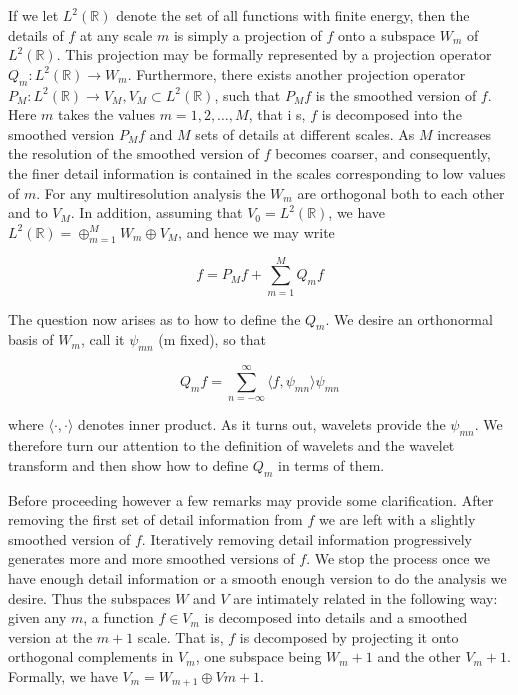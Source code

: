 \documentclass[a4paper,12pt]{article}
\begin{document}
 If we let \(L^2(\mathbb{R})\) denote the set of all functions with finite energy, then the details of \(f\) at 
 any scale \(m\) is simply a projection of \(f\) onto a subspace \(W_m\) of \(L^2(\mathbb{R})\). This projection 
 may be formally represented by a projection operator \(Q_m : L^2(\mathbb{R}) \rightarrow W_m\). Furthermore, 
 there exists another projection operator \(P_M : L^2(\mathbb{R}) \rightarrow V_M, V_M \subset L^2(\mathbb{R})\), 
 such that \(P_M f\) is the smoothed version of \(f\). Here \(m\) takes the values \(m = 1,2,\ldots ,M\), that i
 s, \(f\) is decomposed into the smoothed version \(P_M f\) and \(M\) sets of details at different scales. 
 As \(M\) increases the resolution of the smoothed version of \(f\) becomes coarser, and consequently, the finer 
 detail information is contained in the scales corresponding to low values of \(m\). For any multiresolution 
 analysis the \(W_m\) are orthogonal both to each other and to \(V_M\). In addition, assuming 
 that \(V_0 = L^2(\mathbb{R})\), we have \(L^2(\mathbb{R}) = \oplus_{m=1}^{M} W_m \oplus V_M\), and hence we may write

\[ f = P_M f + \sum_{m=1}^{M} Q_m f \]

The question now arises as to how to define the \(Q_m\).
We desire an orthonormal basis of \(W_m\), call it \(\psi_{mn}\) (m fixed), so that

\[
Q_m f = \sum_{n=-\infty}^{\infty} \langle f, \psi_{mn} \rangle \psi_{mn}
\]

where \(\langle \cdotp,\cdotp \rangle\) denotes inner product. As it turns out, wavelets provide 
the \(\psi_{mn}\)\(\). We therefore turn our attention to the definition of wavelets and the wavelet transform and 
then show how to define \(Q_m\) in terms of them.

Before proceeding however a few remarks may provide some clarification. After removing the first set of detail 
information from \(f\) we are left with a slightly smoothed version of \(f\). Iteratively removing detail information 
progressively generates more and more smoothed versions of \(f\). We stop the process once we have enough detail 
information or a smooth enough version to do the analysis we desire. Thus the subspaces \(W\) and \(V\) are intimately 
related in the following way: given any \(m\), a function \(f \in V_m\) is decomposed into details and a smoothed 
version at the \(m + 1\) scale. That is, \(f\) is decomposed by projecting it onto orthogonal complements 
in \(V_m\), one subspace being \(W_m+1\) and the other \(V_m+1\).
 Formally, we have \(V_m = W_{m+1} \oplus V{m+1}\).
\end{document}
